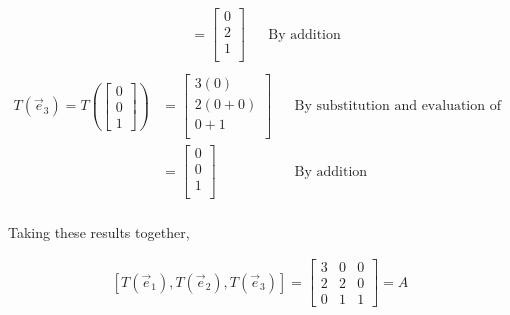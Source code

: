 \documentclass[10pt,letterpaper,final]{report}
\newcommand{\reason}[1]{&& \text{#1}}
\begin{document}
\begin{enumerate}[label=(\alph*)]
\begin{align*}
                                                                & = \begin{bmatrix}
                                                                      0 \\
                                                                      2 \\
                                                                      1 \\
                                                                    \end{bmatrix} \reason{By addition}                         \\[1ex]
        \end{align*}
        \begin{align*}
          T(\vec{e}_3) = T(\begin{bmatrix}0\\0\\1\end{bmatrix}) & = \begin{bmatrix}
                                                                      3(0)     \\
                                                                      2(0 + 0) \\
                                                                      0 + 1    \\
                                                                    \end{bmatrix} \reason{By substitution and evaluation of T} \\[1ex]
                                                                & = \begin{bmatrix}
                                                                      0 \\
                                                                      0 \\
                                                                      1 \\
                                                                    \end{bmatrix} \reason{By addition}                         \\[1ex]
        \end{align*}

        Taking these results together,

        \begin{align*}
          \left[T(\vec{e}_1), T(\vec{e}_2), T(\vec{e}_3)\right] = \begin{bmatrix}
                                                                    3 & 0 & 0 \\
                                                                    2 & 2 & 0 \\
                                                                    0 & 1 & 1
                                                                  \end{bmatrix} = A
        \end{align*}


\end{enumerate}
\end{document}
